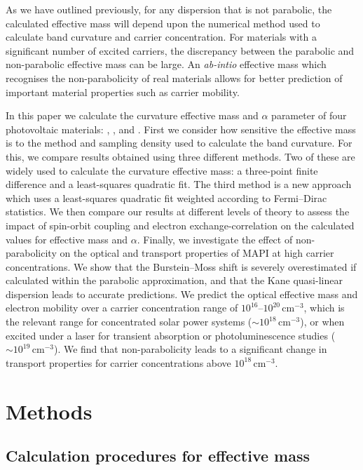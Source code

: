 As we have outlined previously, for any dispersion that is not parabolic, the calculated effective mass will depend upon the numerical method used to calculate band curvature and carrier concentration.
For materials with a significant number of excited carriers, the discrepancy between the parabolic and non-parabolic effective mass can be large.\autocite{Ruf1990,Riffe2002}
An \textit{ab-intio} effective mass which recognises the non-parabolicity of real materials allows for better prediction of important material properties such as carrier mobility. 

In this paper we calculate the curvature effective mass and $\alpha$ parameter of four photovoltaic materials: , ,  and . 
First we consider how sensitive the effective mass is to the method and sampling density used to calculate the band curvature. 
For this, we compare results obtained using three different methods. 
Two of these are widely used to calculate the curvature effective mass: a three-point finite difference and a least-squares quadratic fit. 
The third method is a new approach which uses a least-squares quadratic fit weighted according to Fermi--Dirac statistics. 
We then compare our results at different levels of theory to assess the impact of spin-orbit coupling and electron exchange-correlation on the calculated values for effective mass and $\alpha$. 
Finally, we investigate the effect of non-parabolicity on the optical and transport properties of MAPI at high carrier concentrations. 
We show that the Burstein--Moss shift is severely overestimated if calculated within the parabolic approximation, and that the Kane quasi-linear dispersion leads to accurate predictions.
We predict the optical effective mass and electron mobility over a carrier concentration range of $10^{16}$--$10^{20}\,\mathrm{cm}^{-3}$, which is the relevant range for concentrated solar power systems ($\sim10^{18}\,\mathrm{cm}^{-3}$)\autocite{Law2014}, or when excited under a laser for transient absorption or photoluminescence studies ($\sim10^{19}\,\mathrm{cm}^{-3}$).
We find that non-parabolicity leads to a significant change in transport properties for carrier concentrations above $10^{18}\,\mathrm{cm}^{-3}$.


\section{Methods}

\subsection{Calculation procedures for effective mass}

